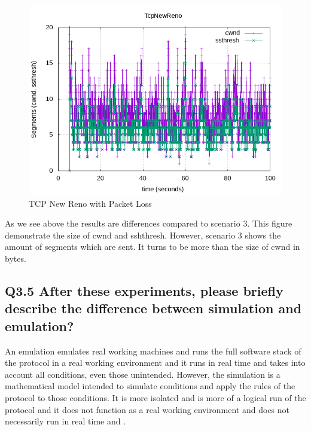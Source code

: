\documentclass{article}
\begin{document}
\begin{figure}[H]
\centering
\includegraphics[width=12cm]{figures/tcpnewreno.png}
\caption{TCP New Reno with Packet Loss}
\end{figure}


As we see above the results are differences compared to scenario 3. This figure demonstrate the size of cwnd and sshthresh. However, scenario 3 shows the amount of segments which are sent. It turns to be more than the size of cwnd in bytes. 






\subsection{Q3.5 After these experiments, please briefly describe the
difference between simulation and emulation?}

An emulation emulates real working machines and runs the full software stack of the protocol in a real working environment and it runs in real time and takes into account all conditions, even those unintended. However, the simulation is a mathematical model intended to simulate conditions and apply the rules of the protocol to those conditions. It is more isolated and is more of a logical run of the protocol and it does not function as a real working environment and does not necessarily run in real time and .
\end{document}
